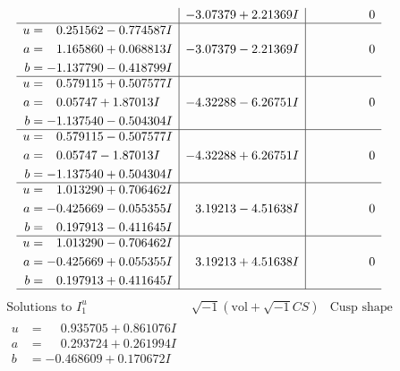 \documentclass[1p]{elsarticle_modified}
\theoremstyle{definition}
\newcommand{\I}{\sqrt{-1}}
\begin{document}
$$\begin{array}{c|c|c}
 & -3.07379 + 2.21369 I & \phantom{-0.000000 } 0 \\ \hline\begin{aligned}
u &= \phantom{-}0.251562 - 0.774587 I \\
a &= \phantom{-}1.165860 + 0.068813 I \\
b &= -1.137790 - 0.418799 I\end{aligned}
 & -3.07379 - 2.21369 I & \phantom{-0.000000 } 0 \\ \hline\begin{aligned}
u &= \phantom{-}0.579115 + 0.507577 I \\
a &= \phantom{-}0.05747 + 1.87013 I \\
b &= -1.137540 - 0.504304 I\end{aligned}
 & -4.32288 - 6.26751 I & \phantom{-0.000000 } 0 \\ \hline\begin{aligned}
u &= \phantom{-}0.579115 - 0.507577 I \\
a &= \phantom{-}0.05747 - 1.87013 I \\
b &= -1.137540 + 0.504304 I\end{aligned}
 & -4.32288 + 6.26751 I & \phantom{-0.000000 } 0 \\ \hline\begin{aligned}
u &= \phantom{-}1.013290 + 0.706462 I \\
a &= -0.425669 - 0.055355 I \\
b &= \phantom{-}0.197913 - 0.411645 I\end{aligned}
 & \phantom{-}3.19213 - 4.51638 I & \phantom{-0.000000 } 0 \\ \hline\begin{aligned}
u &= \phantom{-}1.013290 - 0.706462 I \\
a &= -0.425669 + 0.055355 I \\
b &= \phantom{-}0.197913 + 0.411645 I\end{aligned}
 & \phantom{-}3.19213 + 4.51638 I & \phantom{-0.000000 } 0\\
 \hline 
 \end{array}$$\newpage$$\begin{array}{c|c|c}  
\text{Solutions to }I^u_{1}& \I (\text{vol} + \sqrt{-1}CS) & \text{Cusp shape}\\
 \hline 
\begin{aligned}
u &= \phantom{-}0.935705 + 0.861076 I \\
a &= \phantom{-}0.293724 + 0.261994 I \\
b &= -0.468609 + 0.170672 I\end{aligned}

\end{array}$$
\end{document}
